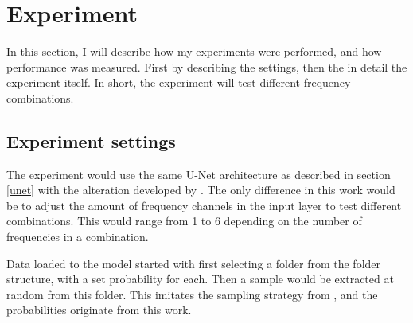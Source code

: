 \section{Experiment} \label{Experiment}
    In this section, I will describe how my experiments were performed, and how performance was measured. First by describing the settings, then the in detail the experiment itself. In short, the experiment will  test different frequency combinations.
    
    \subsection{Experiment settings} \label{Experiment settings}
        The experiment would use the same U-Net architecture as described in section \ref{unet} with the alteration developed by \citeauthor{brautaset2020acoustic}\cite{brautaset2020acoustic}. The only difference in this work would be to adjust the amount of frequency channels in the input layer to test different combinations. This would range from 1 to 6 depending on the number of frequencies in a combination.
        
        Data loaded to the model started with first selecting a folder from the folder structure, with a set probability for each. Then a sample would be extracted at random from this folder. This imitates the sampling strategy from \citeauthor{brautaset2020acoustic}\cite{brautaset2020acoustic}, and the probabilities originate from this work.
        
